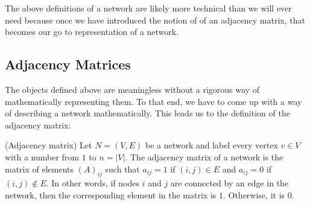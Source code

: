 The above definitions of a network are likely more technical than we will ever need because once we have introduced the notion of of an adjacency matrix, that becomes our go to representation of a network.

\subsection{Adjacency Matrices}
The objects defined above are meaningless without a rigorous way of mathematically representing them. To that end, we have to come up with a way of describing a network mathematically. This leads us to the definition of the adjacency matrix:

\begin{definition}{(Adjacency matrix)}
    Let $N = (V, E)$ be a network and label every vertex $v \in V$ with a number from $1$ to $n = |V|$. The adjacency matrix of a network is the matrix of elements $(A)_{ij}$ such that $a_{ij} = 1$ if $(i, j) \in E$ and $a_{ij} = 0$ if $(i, j) \notin E$. In other words, if nodes $i$ and $j$ are connected by an edge in the network, then the corresponding element in the matrix is $1$. Otherwise, it is $0$.\label{def:adjacency_matrix}\cite[111]{newman10}
\end{definition}

